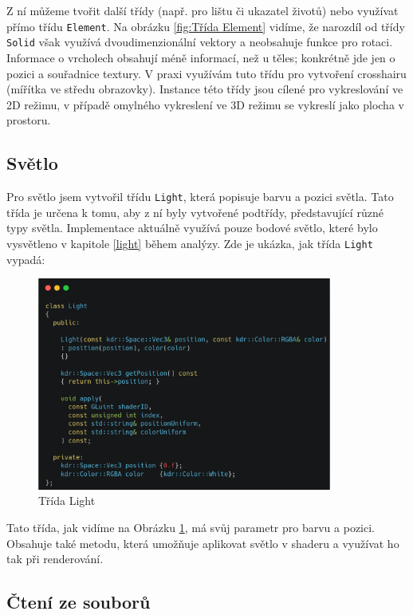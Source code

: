 \documentclass[12pt]{article}
\begin{document}
Z ní můžeme tvořit další třídy (např. pro lištu či ukazatel životů) nebo využívat přímo třídu \texttt{Element}. Na obrázku \ref{fig:Třída Element} vidíme, že narozdíl od třídy \texttt{Solid} však využívá dvoudimenzionální vektory a neobsahuje funkce pro rotaci. Informace o vrcholech obsahují méně informací, než u těles; konkrétně jde jen o pozici a souřadnice textury. V praxi využívám tuto třídu pro vytvoření crosshairu (mířítka ve středu obrazovky). Instance této třídy jsou cílené pro vykreslování ve 2D režimu, v případě omylného vykreslení ve 3D režimu se vykreslí jako plocha v prostoru.

\subsection{Světlo}

Pro světlo jsem vytvořil třídu \texttt{Light}, která popisuje barvu a pozici světla. Tato třída je určena k tomu, aby z ní byly vytvořené podtřídy, představující různé typy světla. Implementace aktuálně využívá pouze bodové světlo, které bylo vysvětleno v kapitole \ref{light} během analýzy. Zde je ukázka, jak třída \texttt{Light} vypadá:

\vspace{0.5cm}
\begin{figure}[h]
    \centering
    \includegraphics[height=7cm]{images/light.png}
    \caption{Třída Light}
    \label{fig:Třída Light}
\end{figure}

Tato třída, jak vidíme na Obrázku \ref{fig:Třída Light}, má svůj parametr pro barvu a pozici. Obsahuje také metodu, která umožňuje aplikovat světlo v shaderu a využívat ho tak při renderování.

\subsection{Čtení ze souborů}
\end{document}

